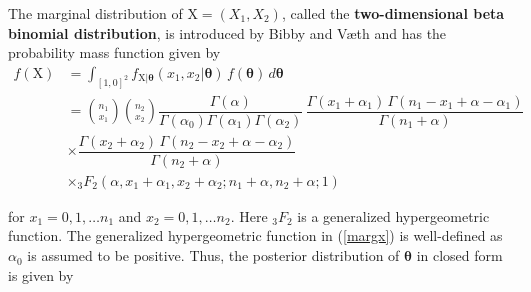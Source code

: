 \documentclass[AMA,Times1COL]{WileyNJDv5} %
\newcommand{\bX}{\boldsymbol{\mathrm{X}}}
\begin{document}
\vspace{2mm}

The marginal distribution of $\bX=(X_{1}, X_{2})$, called the \textbf{two-dimensional beta binomial distribution}, is introduced by Bibby and V{\ae}th \cite{BIBBY2011} and has the probability mass function given by
\begin{align}\label{margx}
f(\bX)&=\int_{
[1,0]^2}f_{\bX \vert \boldsymbol{\theta}}(x_{1}, x_{2} \vert \boldsymbol{\theta} )\, f(\boldsymbol{\theta})\, d\boldsymbol{\theta}\nonumber\\[3pt]
&= {n_1 \choose x_{1}} {n_2 \choose x_{2}} \dfrac{\Gamma(\alpha)}{\Gamma(\alpha_0)\Gamma(\alpha_1)\Gamma(\alpha_2)} \, \dfrac{\Gamma(x_{1}+\alpha_1)\,  \Gamma(n_1-x_{1}+\alpha-\alpha_1)}{\Gamma(n_1
+\alpha)} \nonumber\\[3pt]
&\times \dfrac{\Gamma(x_{2}+\alpha_2) \,  \Gamma(n_2-x_{2}+\alpha-\alpha_2)}{\Gamma(n_2
+\alpha)} \nonumber\\
&\times {}_3 F_2(\alpha,x_{1}+\alpha_1, x_{2}+\alpha_2; n_1+\alpha, n_2+\alpha;1)
\end{align}

for $x_{1}=0,1, \dots n_1$ and $x_{2}=0,1, \dots n_2$. Here ${}_3 F_2$ is a generalized hypergeometric function. The generalized hypergeometric function in
(\ref{margx}) is well-defined as $\alpha_0$ is assumed to be positive. Thus, the posterior distribution of $\boldsymbol{\theta}$ in closed form is given by\newpage
\end{document}
